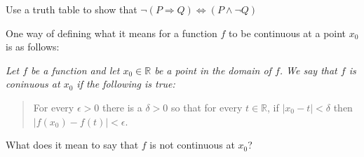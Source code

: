 \begin{exercise}\label{exer:implication}
Use a truth table to show that $\neg(P\Rightarrow Q)\Leftrightarrow(P\land \neg Q)$
\end{exercise}

\begin{exercise}
One way of defining what it means for a function $f$ to be continuous at
a point $x_0$ is as follows:

\smallbreak\noindent
{\slshape Let $f$ be a function and let $x_0\in{\mathbb R}$ be a point in the domain of $f$. We say that $f$ is coninuous at $x_0$ if the following is true:
\begin{quote}
For every $\epsilon>0$ there is a $\delta >0$ so that for every $t\in {\mathbb R}$, if $|x_0-t|<\delta$ then $|f(x_0)-f(t)|<\epsilon$. 
\end{quote}}
\smallbreak\noindent
What does it mean to say that $f$ is not continuous at $x_0$?
\end{exercise}

\clearpage

